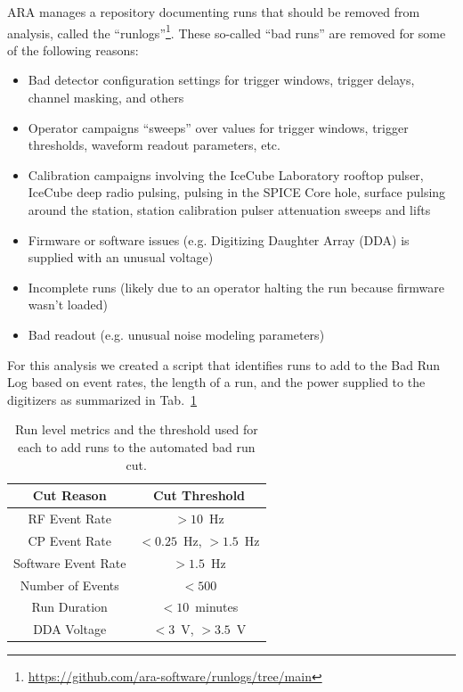     ARA manages a repository documenting runs that should be removed from analysis, called the ``runlogs''\footnote{\url{https://github.com/ara-software/runlogs/tree/main}}.
    These so-called ``bad runs'' are removed for some of the following reasons:
    \begin{itemize}
      \item Bad detector configuration settings for trigger windows, trigger delays, channel masking, and others
      \item Operator campaigns ``sweeps'' over values for trigger windows, trigger thresholds, waveform readout parameters, etc.
      \item Calibration campaigns involving the IceCube Laboratory rooftop pulser, IceCube deep radio pulsing, pulsing in the SPICE Core hole, surface pulsing around the station, station calibration pulser attenuation sweeps and lifts
      \item Firmware or software issues (e.g. Digitizing Daughter Array (DDA) is supplied with an unusual voltage)
      \item Incomplete runs (likely due to an operator halting the run because firmware wasn't loaded)
      \item Bad readout (e.g. unusual noise modeling parameters)
    \end{itemize}
    For this analysis we created a script that identifies runs to add to the Bad Run Log based on event rates, the length of a run, and the power supplied to the digitizers as summarized in Tab.~\ref{tab:automated_brc}
    
    \begin{table}
      \centering
      \begin{tabular}{|c|c|}
        \hline
        Cut Reason & Cut Threshold \\
        \hline
        RF Event Rate & $>10$~Hz \\
        CP Event Rate & $< 0.25$~Hz, $>1.5$~Hz \\
        Software Event Rate & $>1.5$~Hz \\
        Number of Events & $< 500$ \\
        Run Duration & $<10$~minutes \\
        DDA Voltage & $< 3$~V, $>3.5$~V \\
        \hline
      \end{tabular}
      \caption{
        Run level metrics and the threshold used for each to add runs to the automated bad run cut. 
      }
      \label{tab:automated_brc}
    \end{table}
  
